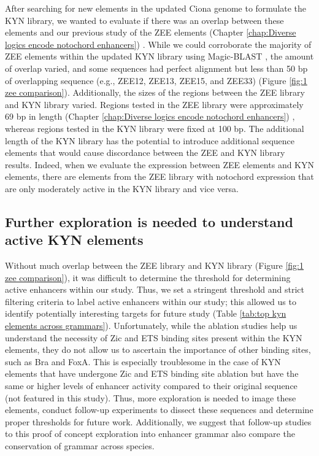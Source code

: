 After searching for new elements in the updated Ciona genome to formulate the KYN library, we wanted to evaluate if there was an overlap between these elements and our previous study of the ZEE elements (Chapter \ref{chap:Diverse logics encode notochord enhancers}) \cite{song2022}. While we could corroborate the majority of ZEE elements within the updated KYN library using Magic-BLAST \cite{boratyn2019}, the amount of overlap varied, and some sequences had perfect alignment but less than 50 bp of overlapping sequence (e.g., ZEE12, ZEE13, ZEE15, and ZEE33) (Figure \ref{fig:1 zee comparison}). Additionally, the sizes of the regions between the ZEE library and KYN library varied. Regions tested in the ZEE library were approximately 69 bp in length (Chapter \ref{chap:Diverse logics encode notochord enhancers}) \cite{song2022}, whereas regions tested in the KYN library were fixed at 100 bp. The additional length of the KYN library has the potential to introduce additional sequence elements that would cause discordance between the ZEE and KYN library results. Indeed, when we evaluate the expression between ZEE elements and KYN elements, there are elements from the ZEE library with notochord expression that are only moderately active in the KYN library and vice versa. 

\subsection{Further exploration is needed to understand active KYN elements}

Without much overlap between the ZEE library and KYN library (Figure \ref{fig:1 zee comparison}), it was difficult to determine the threshold for determining active enhancers within our study. Thus, we set a stringent threshold and strict filtering criteria to label active enhancers within our study; this allowed us to identify potentially interesting targets for future study (Table \ref{tab:top kyn elements across grammars}). Unfortunately, while the ablation studies help us understand the necessity of Zic and ETS binding sites present within the KYN elements, they do not allow us to ascertain the importance of other binding sites, such as Bra and FoxA. This is especially troublesome in the case of KYN elements that have undergone Zic and ETS binding site ablation but have the same or higher levels of enhancer activity compared to their original sequence (not featured in this study). Thus, more exploration is needed to image these elements, conduct follow-up experiments to dissect these sequences and determine proper thresholds for future work. Additionally, we suggest that follow-up studies to this proof of concept exploration into enhancer grammar also compare the conservation of grammar across species. 

